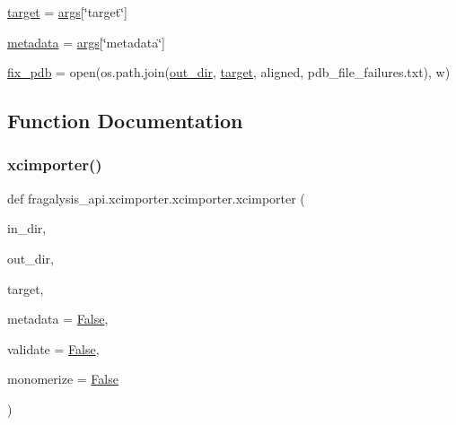 \begin{DoxyCompactItemize}
\item 
\hyperlink{namespacefragalysis__api_1_1xcimporter_1_1xcimporter_a2c93b8722226ac96f6668b2fc07515e8}{target} = \hyperlink{namespacefragalysis__api_1_1xcimporter_1_1xcimporter_a3ad0db7b1c2c8a00d4963bf5f7dd21bc}{args}\mbox{[}\char`\"{}target\char`\"{}\mbox{]}
\item 
\hyperlink{namespacefragalysis__api_1_1xcimporter_1_1xcimporter_a3414d616d16bdcc9b7bbfd56591a406d}{metadata} = \hyperlink{namespacefragalysis__api_1_1xcimporter_1_1xcimporter_a3ad0db7b1c2c8a00d4963bf5f7dd21bc}{args}\mbox{[}\char`\"{}metadata\char`\"{}\mbox{]}
\item 
\hyperlink{namespacefragalysis__api_1_1xcimporter_1_1xcimporter_abbbe817fae311228915dac1ff528045e}{fix\+\_\+pdb} = open(os.\+path.\+join(\hyperlink{namespacefragalysis__api_1_1xcimporter_1_1xcimporter_a48b550a7c1c2ca499d6f204c133ae41d}{out\+\_\+dir}, \hyperlink{namespacefragalysis__api_1_1xcimporter_1_1xcimporter_a2c93b8722226ac96f6668b2fc07515e8}{target}, \textquotesingle{}aligned\textquotesingle{}, \textquotesingle{}pdb\+\_\+file\+\_\+failures.\+txt\textquotesingle{}), \textquotesingle{}w\textquotesingle{})
\end{DoxyCompactItemize}


\subsection{Function Documentation}
\mbox{\label{namespacefragalysis__api_1_1xcimporter_1_1xcimporter_a673f390dc6b7d0062ec8d9510079dded}} 
\subsubsection{\texorpdfstring{xcimporter()}{xcimporter()}}
{\footnotesize\ttfamily def fragalysis\+\_\+api.\+xcimporter.\+xcimporter.\+xcimporter (\begin{DoxyParamCaption}\item[{}]{in\+\_\+dir,  }\item[{}]{out\+\_\+dir,  }\item[{}]{target,  }\item[{}]{metadata = {\ttfamily \hyperlink{namespacefragalysis__api_1_1xcimporter_1_1xcimporter_a7b54c2ad280b13dc0833892106613e4c}{False}},  }\item[{}]{validate = {\ttfamily \hyperlink{namespacefragalysis__api_1_1xcimporter_1_1xcimporter_a7b54c2ad280b13dc0833892106613e4c}{False}},  }\item[{}]{monomerize = {\ttfamily \hyperlink{namespacefragalysis__api_1_1xcimporter_1_1xcimporter_a7b54c2ad280b13dc0833892106613e4c}{False}} }\end{DoxyParamCaption})}


